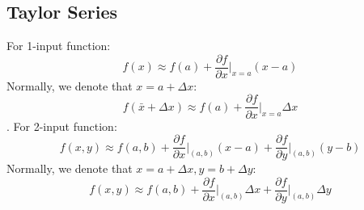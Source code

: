 \begin{itemize}
\subsection{Taylor Series}
For 1-input function:
\begin{equation}
    f(x) \approx f(a) + \frac{{\partial f}}{{\partial x}}\Bigg|_{x=a}(x - a)
\end{equation}
Normally, we denote that $x=a + \Delta x$:
\begin{equation}
    f(\bar x + \Delta x) \approx f(a) + \frac{{\partial f}}{{\partial x}}\Bigg|_{x=a}\Delta x
\end{equation}.
For 2-input function:
\begin{equation}
    f(x, y) \approx f(a, b) + \frac{{\partial f}}{{\partial x}}\Bigg|_{(a, b)}(x - a) + \frac{{\partial f}}{{\partial y}}\Bigg|_{(a, b)}(y - b)
\end{equation}
Normally, we denote that $x=a + \Delta x, y=b + \Delta y$:
\begin{equation}
    f(x, y) \approx f(a, b) + \frac{{\partial f}}{{\partial x}}\Bigg|_{(a, b)}\Delta x + \frac{{\partial f}}{{\partial y}}\Bigg|_{(a, b)}\Delta y
\end{equation}
\end{itemize}